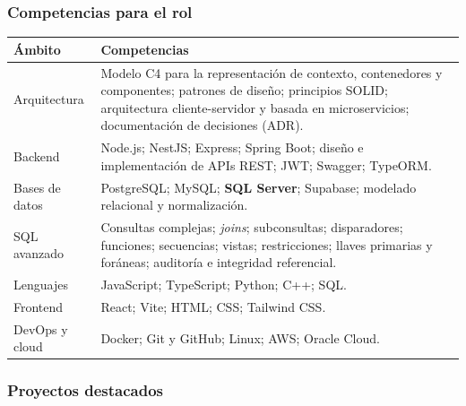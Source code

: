 \subsubsection{Competencias para el rol}

\begin{center}
\begin{tabularx}{\linewidth}{@{}L{4.0cm} Y@{}}
\toprule
\sffamily\bfseries\color{lgPrimario}Ámbito &
\sffamily\bfseries\color{lgPrimario}Competencias \\
\midrule
Arquitectura & Modelo C4 para la representación de contexto, contenedores y componentes; patrones de diseño; principios SOLID; arquitectura cliente-servidor y basada en microservicios; documentación de decisiones (ADR). \\
Backend & Node.js; NestJS; Express; Spring Boot; diseño e implementación de APIs REST; JWT; Swagger; TypeORM. \\
Bases de datos & PostgreSQL; MySQL; \textbf{SQL Server}; Supabase; modelado relacional y normalización. \\
SQL avanzado & Consultas complejas; \emph{joins}; subconsultas; disparadores; funciones; secuencias; vistas; restricciones; llaves primarias y foráneas; auditoría e integridad referencial. \\
Lenguajes & JavaScript; TypeScript; Python; C++; SQL. \\
Frontend & React; Vite; HTML; CSS; Tailwind CSS. \\
DevOps y cloud & Docker; Git y GitHub; Linux; AWS; Oracle Cloud. \\
\bottomrule
\end{tabularx}
\end{center}

\subsubsection{Proyectos destacados}

